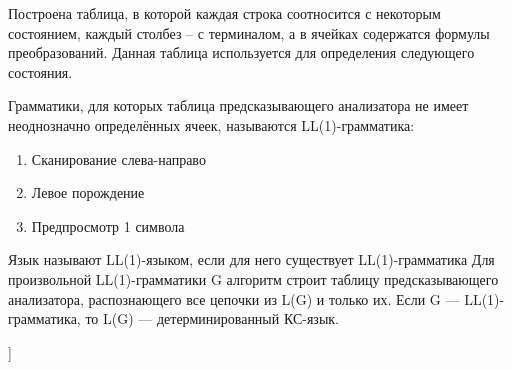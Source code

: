 Построена таблица, в которой каждая строка соотносится с некоторым состоянием, каждый столбез -- с терминалом, а в ячейках содержатся формулы преобразований. Данная таблица используется для определения следующего состояния.

Грамматики, для которых таблица предсказывающего анализатора не имеет неоднозначно определённых ячеек, называются LL(1)-грамматика:
\begin{enumerate}
\item Сканирование слева-направо
\item Левое порождение
\item Предпросмотр 1 символа
\end{enumerate}

Язык называют LL(1)-языком, если для него существует LL(1)-грамматика \newline
Для произвольной LL(1)-грамматики G алгоритм строит таблицу
предсказывающего анализатора, распознающего все цепочки из L(G) и только их.\newline
Если G — LL(1)-грамматика, то L(G) — детерминированный КС-язык.


\bigbreak
[\cite[page 69-96]{replace_me}]